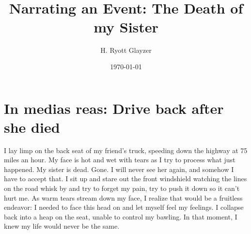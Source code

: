 \documentclass[12pt, letterpaper]{article}
\title{Narrating an Event: The Death of my Sister}
\author{H. Ryott Glayzer}
\date{\today}
\begin{document}
\maketitle

\section*{In medias reas: Drive back after she died}
I lay limp on the back seat of my friend's truck,
speeding down the highway at 75 miles an hour.
My face is hot and wet with tears as I try to process what just happened.
My sister is dead.
Gone.
I will never see her again, and somehow I have to accept that.
I sit up and stare out the front windshield watching the lines on the road whisk by
and try to forget my pain, try to push it down so it can't hurt me.
As warm tears stream down my face, I realize that would be a fruitless
endeavor:
I needed to face this head on and let myself feel my feelings.
I collapse back into a heap on the seat, unable to control my bawling.
In that moment, I knew my life would never be the same.
\end{document}
